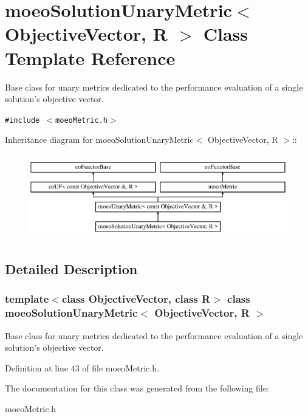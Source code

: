 \section{moeo\-Solution\-Unary\-Metric$<$ Objective\-Vector, R $>$ Class Template Reference}
\label{classmoeoSolutionUnaryMetric}
Base class for unary metrics dedicated to the performance evaluation of a single solution's objective vector.  


{\tt \#include $<$moeo\-Metric.h$>$}

Inheritance diagram for moeo\-Solution\-Unary\-Metric$<$ Objective\-Vector, R $>$::\begin{figure}[H]
\begin{center}
\leavevmode
\includegraphics[height=3.70861cm]{classmoeoSolutionUnaryMetric}
\end{center}
\end{figure}


\subsection{Detailed Description}
\subsubsection*{template$<$class Objective\-Vector, class R$>$ class moeo\-Solution\-Unary\-Metric$<$ Objective\-Vector, R $>$}

Base class for unary metrics dedicated to the performance evaluation of a single solution's objective vector. 



Definition at line 43 of file moeo\-Metric.h.

The documentation for this class was generated from the following file:\begin{CompactItemize}
\item 
moeo\-Metric.h\end{CompactItemize}
